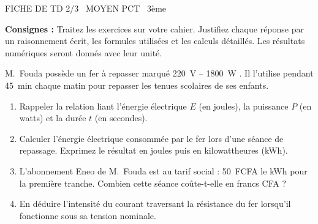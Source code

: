 \documentclass[11pt]{article}
\begin{document}
\begin{tcolorbox}[enhanced,colback=popink,colframe=popink,arc=10pt,boxrule=0pt,left=12pt,right=12pt,top=9pt,bottom=9pt]
{\color{white}\popxbold\small FICHE DE TD 2/3 \textbullet\ MOYEN \hfill PCT \textbullet\ 3ème\par}
\end{tcolorbox}
\vspace{4pt}
\noindent\textbf{Consignes :} Traitez les exercices sur votre cahier. Justifiez chaque réponse par un raisonnement écrit, les formules utilisées et les calculs détaillés. Les résultats numériques seront donnés avec leur unité.

\begin{exercice}
M.~Fouda possède un fer à repasser marqué \og \SI{220}{V} -- \SI{1800}{W} \fg. Il l'utilise pendant \SI{45}{min} chaque matin pour repasser les tenues scolaires de ses enfants.
\begin{enumerate}
    \item Rappeler la relation liant l'énergie électrique $E$ (en joules), la puissance $P$ (en watts) et la durée $t$ (en secondes).
    \item Calculer l'énergie électrique consommée par le fer lors d'une séance de repassage. Exprimez le résultat en joules puis en kilowattheures (\si{kWh}).
    \item L'abonnement \og Eneo \fg{} de M.~Fouda est au tarif social : \SI{50}{FCFA} le \si{kWh} pour la première tranche. Combien cette séance coûte-t-elle en francs CFA ?
    \item En déduire l'intensité du courant traversant la résistance du fer lorsqu'il fonctionne sous sa tension nominale.
\end{enumerate}
\end{exercice}
\end{document}
